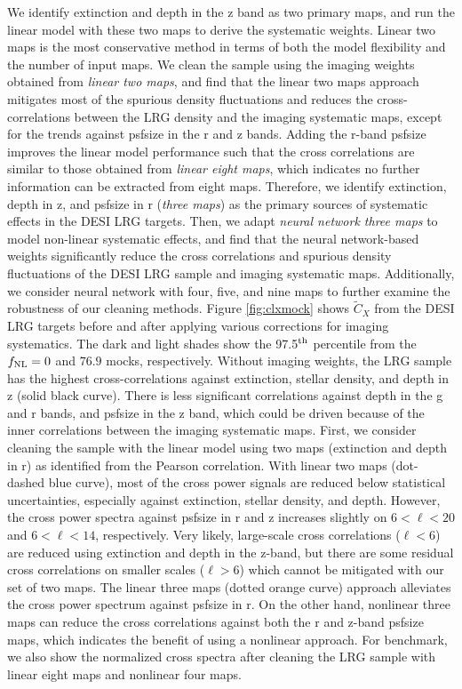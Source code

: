 We identify extinction and depth in the z band as two primary maps, and run the linear model with these two maps to derive the systematic weights. Linear two maps is the most conservative method in terms of both the model flexibility and the number of input maps. We clean the sample using the imaging weights obtained from \textit{linear two maps}, and find that the linear two maps approach mitigates most of the spurious density fluctuations and reduces the cross-correlations between the LRG density and the imaging systematic maps, except for the trends against psfsize in the r and z bands. Adding the r-band psfsize improves the linear model performance such that the cross correlations are similar to those obtained from \textit{linear eight maps}, which indicates no further information can be extracted from eight maps. Therefore, we identify extinction, depth in z, and psfsize in r (\textit{three maps}) as the primary sources of systematic effects in the DESI LRG targets. Then, we adapt \textit{neural network three maps} to model non-linear systematic effects, and find that the neural network-based weights significantly reduce the cross correlations and spurious density fluctuations of the DESI LRG sample and imaging systematic maps. Additionally, we consider neural network with four, five, and nine maps to further examine the robustness of our cleaning methods. Figure \ref{fig:clxmock} shows $\tilde{C}_{X}$ from the DESI LRG targets before and after applying various corrections for imaging systematics. The dark and light shades show the 97.5$^{\rm th}$ percentile from the $f_{\rm NL}=0$ and $76.9$ mocks, respectively. Without imaging weights, the LRG sample has the highest cross-correlations against extinction, stellar density, and depth in z (solid black curve). There is less significant correlations against depth in the g and r bands, and psfsize in the z band, which could be driven because of the inner correlations between the imaging systematic maps. First, we consider cleaning the sample with the linear model using two maps (extinction and depth in r) as identified from the Pearson correlation. With linear two maps (dot-dashed blue curve), most of the cross power signals are reduced below statistical uncertainties, especially against extinction, stellar density, and depth. However, the cross power spectra against psfsize in r and z increases slightly on $6<\ell<20$ and $6<\ell<14$, respectively. Very likely, large-scale cross correlations ($\ell < 6$) are reduced using extinction and depth in the z-band, but there are some residual cross correlations on smaller scales ($\ell > 6$) which cannot be mitigated with our set of two maps. The linear three maps (dotted orange curve) approach alleviates the cross power spectrum against psfsize in r. On the other hand, nonlinear three maps can reduce the cross correlations against both the r and z-band psfsize maps, which indicates the benefit of using a nonlinear approach. For benchmark, we also show the normalized cross spectra after cleaning the LRG sample with linear eight maps and nonlinear four maps. 


